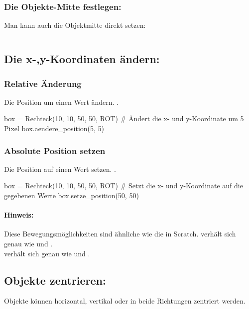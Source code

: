 \documentclass{\VorlagenPfad/coderdojokatext}
\begin{document}
\inputminted[firstline=10,lastline=24]{python}{../../../Beispiele/py2cd/objekte_positionieren.py}

\subsubsection{Die Objekte-Mitte festlegen:}
Man kann auch die Objektmitte direkt setzen:

\inputminted[firstline=26,lastline=27]{python}{../../../Beispiele/py2cd/objekte_positionieren.py}

\subsection{Die x-,y-Koordinaten ändern:}

\subsubsection{Relative Änderung}
Die Position um einen Wert ändern. .

\begin{pythoncode}
box = Rechteck(10, 10, 50, 50, ROT)
# Ändert die x- und y-Koordinate um 5 Pixel
box.aendere_position(5, 5)
\end{pythoncode}

\subsubsection{Absolute Position setzen}
Die Position auf einen Wert setzen. .

\begin{pythoncode}
box = Rechteck(10, 10, 50, 50, ROT)
# Setzt die x- und y-Koordinate auf die gegebenen Werte
box.setze_position(50, 50)
\end{pythoncode}

\paragraph{Hinweis:} Diese Bewegungsmöglichkeiten sind ähnliche wie die in Scratch.  verhält sich genau wie  und .
\\
 verhält sich genau wie  und .

\subsection{Objekte zentrieren:}
Objekte können horizontal, vertikal oder in beide Richtungen zentriert werden.
\end{document}
